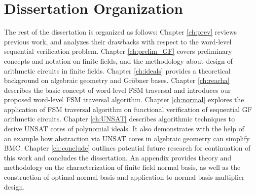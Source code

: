 \section{Dissertation Organization}
The rest of the dissertation is organized as
follows: Chapter \ref{ch:prev} reviews previous work, and analyzes their drawbacks with respect to 
the word-level sequential verification problem.
Chapter \ref{ch:prelim_GF} covers preliminary
concepts and notation on finite fields, and the methodology about design of arithmetic circuits in finite fields.
Chapter \ref{ch:ideals} provides a theoretical background on algebraic geometry and Gr\"obner bases.
Chapter \ref{ch:reacha} describes the basic
concept of word-level FSM traversal and introduces our proposed word-level FSM traversal algorithm. 
Chapter \ref{ch:normal} explores the application of FSM traversal algorithm on 
functional verification of sequential GF arithmetic circuits. Chapter \ref{ch:UNSAT} describes
algorithmic techniques to derive UNSAT cores of polynomial
ideals. It also demonstrates with the help of an example how abstraction via
UNSAT cores in algebraic geometry can simplify BMC. 
Chapter \ref{ch:conclude} outlines potential future research for
continuation of this work and concludes the dissertation. 
An appendix provides theory and methodology on the characterization of finite field normal basis,
as well as the construction of optimal normal basis and application to normal basis multiplier design.